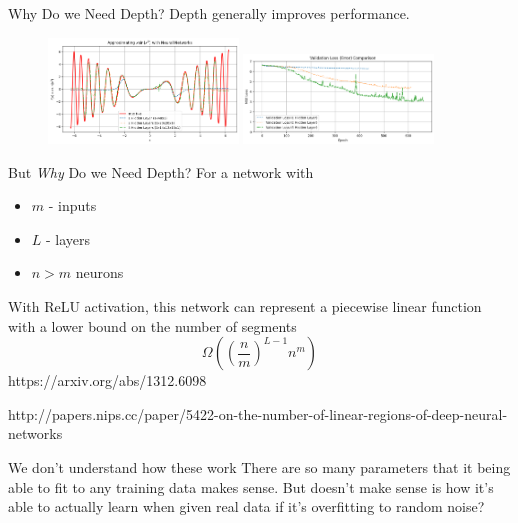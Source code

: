 \documentclass[aspectratio=169, 10pt]{beamer} %
\begin{document}
\begin{frame} {Why Do we Need Depth?}
  Depth generally improves performance.
     \begin{figure}
            \centering
    \includegraphics[width=0.45\textwidth]{./ExampleOfFunctionEstimation.png}
    \includegraphics[width=0.45\textwidth]{./lossBetweenNHiddenLayers.png}
    \end{figure}   %
  
\end{frame}

\begin{frame}{But \textit{Why} Do we Need Depth?}
    For a network with \begin{itemize}
        \item $m$ - inputs
        \item $L$ - layers
        \item $n>m$ neurons 
    \end{itemize}
    With ReLU activation, this network can represent a piecewise linear function with a lower bound on the number of segments $$\Omega\left(\left(\frac{n}{m}\right)^{L-1}n^m\right)$$
    \tiny https://arxiv.org/abs/1312.6098 \par
    http://papers.nips.cc/paper/5422-on-the-number-of-linear-regions-of-deep-neural-networks
\end{frame}

\begin{frame}{We don't understand how these work}
    There are so many parameters that it being able to fit to any training data makes sense. But doesn't make sense is how it's able to actually learn when given real data if it's overfitting to random noise?
    \par

\end{frame}
\end{document}
